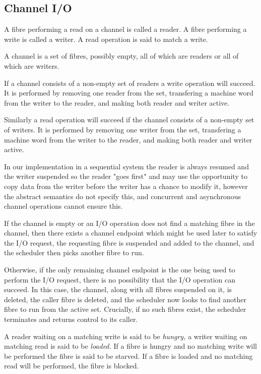 \documentclass[oneside]{book}
\begin{document}
\subsection{Channel I/O}
A fibre performing a read on a channel is called a reader. A fibre performing
a write is called a writer. A read operation is said to match a write.

A channel is a set of fibres, possibly empty, all of which are
readers or all of which are writers.

If a channel consists of a non-empty set of readers a write operation will succeed.
It is performed by removing one reader from the set, transfering a machine word
from the writer to the reader, and making both reader and writer active.

Similarly a read operation will succeed if the channel consists of a non-empty
set of writers. It is performed by removing one writer from the set, transfering
a machine word from the writer to the reader, and making both reader and writer active.

In our implementation in a sequential system the reader is always resumed and the
writer suspended so the reader "goes first" and may use the opportunity to copy
data from the writer before the writer has a chance to modify it, however the
abstract semantics do not specify this, and concurrent and asynchronous channel
operations cannot ensure this.

If the channel is empty or an I/O operation does not find a matching fibre
in the channel, then there exists a channel endpoint which might be used
later to satisfy the I/O request, the requesting fibre is suspended and
added to the channel, and the scheduler then picks another fibre to run.

Otherwise, if the only remaining channel endpoint is the one being
used to perform the I/O request, there is no possibility that the
I/O operation can succeed. In this case, the channel, along with all
fibres suspended on it, is deleted, the caller fibre is deleted,
and the scheduler now looks to find another fibre to run from
the active set. Crucially, if no such fibres exist, the scheduler
terminates and returns control to its caller.

A reader waiting on a matching write is said to be {\em hungry,}
a writer waiting on matching read is said to be {\em loaded.}
If a fibre is hungry and no matching write will be performed
the fibre is said to be starved. If a fibre is loaded and no
matching read will be performed, the fibre is blocked.
\end{document}
